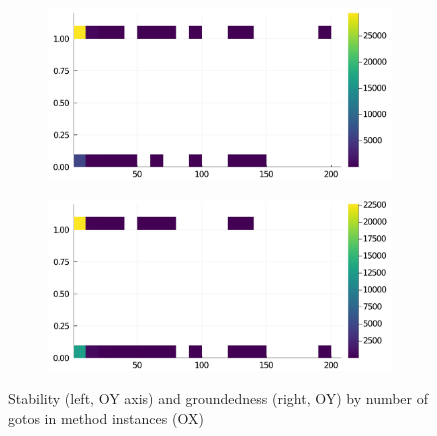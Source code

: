 \begin{figure}[h]
     \begin{subfigure}[b]{0.49\textwidth}
       \includegraphics[width=\textwidth]{figs/all-package-graphs/JuMP-gotos-vs-stable.pdf}
     \end{subfigure}
     \begin{subfigure}[b]{0.49\textwidth}
       \includegraphics[width=\textwidth]{figs/all-package-graphs/JuMP-gotos-vs-grounded.pdf}
     \end{subfigure}
\caption{Stability (left, OY axis) and groundedness (right, OY) by number of gotos in method instances (OX)}%
%
\label{figs:gotos:JuMP}
\end{figure}

